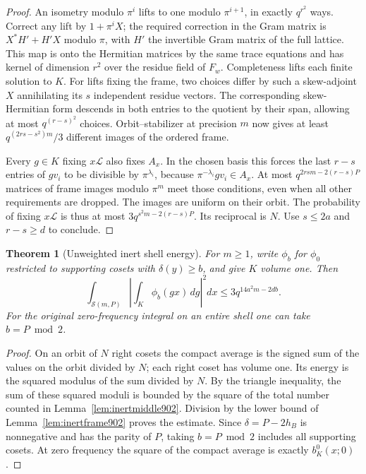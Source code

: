 \documentclass[a4paper,11pt]{article}
\newtheorem{theorem}[proposition]{Theorem}
\theoremstyle{definition}
\theoremstyle{remark}
\numberwithin{equation}{section}
\begin{document}
\begin{proof}
An isometry modulo \(\pi^i\) lifts to one modulo \(\pi^{i+1}\),
in exactly \(q^{r^2}\) ways. Correct any lift by \(1+\pi^iX\);
the required correction in the Gram matrix is \(X^*H'+H'X\)
modulo \(\pi\), with \(H'\) the invertible Gram matrix of the
full lattice. This map is onto the Hermitian matrices by the
same trace equations and has kernel of dimension \(r^2\)
over the residue field of \(F_w\). Completeness lifts each
finite solution to \(K\). For lifts fixing the frame, two
choices differ by such a skew-adjoint \(X\) annihilating its
\(s\) independent residue vectors. The corresponding
skew-Hermitian form descends in both entries to the quotient
by their span, allowing at most \(q^{(r-s)^2}\) choices.
Orbit--stabilizer at precision \(m\) now gives at least
\(q^{(2rs-s^2)m}/3\) different images of the ordered frame.

Every \(g\in K\) fixing \(x\mathcal L\) also fixes \(A_x\).
In the chosen basis this forces the last \(r-s\) entries of
\(g v_i\) to be divisible by \(\pi^{\lambda_i}\), because
\(\pi^{-\lambda_i} g v_i\in A_x\). At most
\(q^{2rsm-2(r-s)P}\) matrices of frame images modulo \(\pi^m\)
meet those conditions, even when all other requirements are
dropped. The images are uniform on their orbit. The probability
of fixing \(x\mathcal L\) is thus at most
\(3q^{s^2m-2(r-s)P}\). Its reciprocal is \(N\). Use
\(s\le2a\) and \(r-s\ge d\) to conclude.
\end{proof}

\begin{theorem}[Unweighted inert shell energy]
\leavevmode\label{thm:inertlength902}
For \(m\ge1\), write \(\phi_b\) for \(\phi_0\) restricted to
supporting cosets with \(\delta(y)\ge b\), and give \(K\) volume
one. Then
\[
 \int_{\mathcal S(m,P)}
       \left|\int_K\phi_b(gx)\,dg\right|^2 dx
                       \le 3q^{14a^2m-2db}.
\]
For the original zero-frequency integral on an entire shell
one can take \(b=P\bmod 2\).
\end{theorem}
\begin{proof}
On an orbit of \(N\) right cosets the compact average is the
signed sum of the values on the orbit divided by \(N\); each
right coset has volume one. Its energy is the squared modulus
of the sum divided by \(N\). By the triangle inequality, the
sum of these squared moduli is bounded by the square of the
total number counted in Lemma~\ref{lem:inertmiddle902}.
Division by the lower bound of Lemma~\ref{lem:inertframe902}
proves the estimate. Since \(\delta=P-2h_B\) is nonnegative
and has the parity of \(P\), taking \(b=P\bmod 2\) includes
all supporting cosets. At zero frequency the square of the
compact average is exactly \(b^0_K(x;0)\).
\end{proof}
\end{document}
